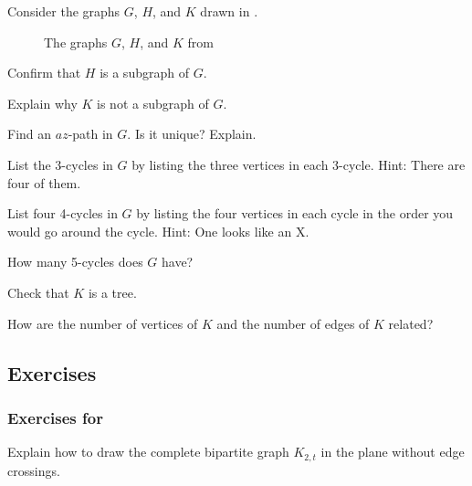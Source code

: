 \begin{act}
\label{act_subgraphs_trees}
    Consider the graphs $G$, $H$, and $K$ drawn in .
        \begin{figure}[hbtp] 
            \centering
            
            \caption{The graphs $G$, $H$, and $K$ from }
            \label{fig_subgraphs_trees}
        \end{figure}
        \begin{actpart}
            \item Confirm that $H$ is a subgraph of $G$.
            \item Explain why $K$ is not a subgraph of $G$.
            \item Find an $az$-path in $G$. Is it unique?  Explain.
            \item List the 3-cycles in $G$ by listing the three vertices in each 3-cycle.  Hint: There are four of them.
            \item List four 4-cycles in $G$ by listing the four vertices in each cycle in the order you would go around the cycle.  Hint: One looks like an X.
            \item How many 5-cycles does $G$ have?
            \item Check that $K$ is a tree.
            \item How are the number of vertices of $K$ and the number of edges of $K$ related?
        \end{actpart}
\end{act}


\subsection{Exercises}


\subsubsection*{Exercises for 
\subplanarity}

\begin{exer}[\exerP] %
\label{exer_K2bn_planar}
   Explain how to draw the complete bipartite graph $K_{2,t}$ in the plane without edge crossings.
\end{exer}

